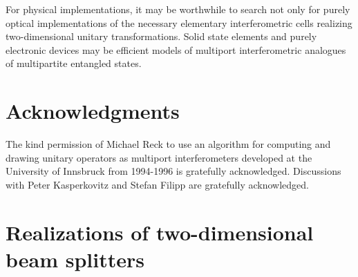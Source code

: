 \documentclass[pra,preprint,showpacs,showkeys,amsfonts]{revtex4}
\begin{document}
For physical implementations,
it may be worthwhile to search not only for  purely  optical implementations
of the necessary elementary
interferometric cells realizing two-dimensional unitary transformations.
Solid state elements and purely electronic devices
may be efficient models of multiport interferometric analogues of multipartite
entangled states.

\section*{Acknowledgments}
The kind permission of Michael Reck to
use an algorithm for computing and drawing
unitary operators as multiport interferometers
developed at the University of Innsbruck from 1994-1996 is gratefully acknowledged.
Discussions with Peter Kasperkovitz and Stefan Filipp are gratefully acknowledged.


\appendix


\section{Realizations of two-dimensional beam splitters}
\label{2004-analog-appendixA}
\end{document}
